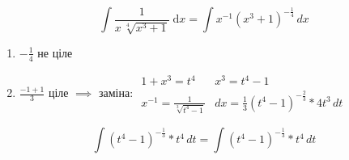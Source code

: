 \documentclass[../rgr1.tex]{subfiles}
\begin{document}
\Solution

\begin{equation}
	\int{\dfrac{1}{x\,\sqrt[{4}]{{x}^{3}+1}}}{\;\mathrm{d}x}
	=\int x^{-1}(x^3+1)^{-\frac{1}{4}}\,dx
\end{equation}

\begin{enumerate}
	\item $-\frac{1}{4}$ не ціле
	\item $\frac{-1+1}{3}$ ціле $\implies$ заміна:
	\fbox
	{
		$\begin{array}{c|c}
			1 + x^3 = t^4 & x^3 = t^4-1 \\
			x^{-1}=\frac{1}{\sqrt[3]{t^4-1}} &
			dx = \frac{1}{3}(t^4-1)^{-\frac{2}{3}}*4t^3\, dt
		\end{array}$
	}
\end{enumerate}

\begin{dmath}
	\int(t^4-1)^{-\frac{1}{3}}*t^4\,dt=
	\int(t^4-1)^{-\frac{1}{3}}*t^4\,dt
\end{dmath}

\end{document}
